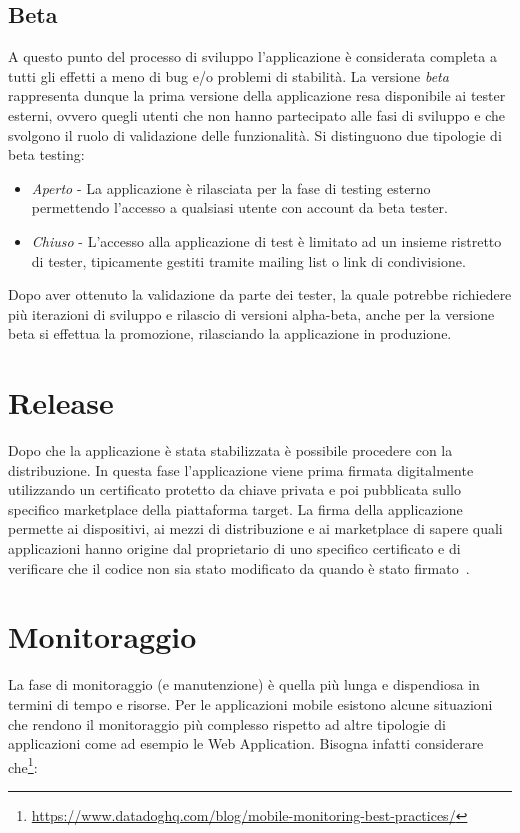 \subsection{Beta}
A questo punto del processo di sviluppo l'applicazione è considerata completa a tutti gli effetti a meno di bug e/o problemi di stabilità. La versione \textit{beta} rappresenta dunque la prima versione della applicazione resa disponibile ai tester esterni, ovvero quegli utenti che non hanno partecipato alle fasi di sviluppo e che svolgono il ruolo di validazione delle funzionalità. Si distinguono due tipologie di beta testing:

\begin{itemize}
    \item \textit{Aperto} - La applicazione è rilasciata per la fase di testing esterno permettendo l'accesso a qualsiasi utente con account da beta tester.
    \item \textit{Chiuso} - L'accesso alla applicazione di test è limitato ad un insieme ristretto di tester, tipicamente gestiti tramite mailing list o link di condivisione.
\end{itemize}

Dopo aver ottenuto la validazione da parte dei tester, la quale potrebbe richiedere più iterazioni di sviluppo e rilascio di versioni alpha-beta, anche per la versione beta si effettua la promozione, rilasciando la applicazione in produzione.

\section{Release}
Dopo che la applicazione è stata stabilizzata è possibile procedere con la distribuzione. In questa fase l'applicazione viene prima firmata digitalmente utilizzando un certificato protetto da chiave privata e poi pubblicata sullo specifico marketplace della piattaforma target. La firma della applicazione permette ai dispositivi, ai mezzi di distribuzione e ai marketplace di sapere quali applicazioni hanno origine dal proprietario di uno specifico certificato e di verificare che il codice non sia stato modificato da quando è stato firmato~\cite{mednieks2011programming}.

\section{Monitoraggio}
La fase di monitoraggio (e manutenzione) è quella più lunga e dispendiosa in termini di tempo e risorse. Per le applicazioni mobile esistono alcune situazioni che rendono il monitoraggio più complesso rispetto ad altre tipologie di applicazioni come ad esempio le Web Application. Bisogna infatti considerare che\footnote{\href{https://www.datadoghq.com/blog/mobile-monitoring-best-practices/}{https://www.datadoghq.com/blog/mobile-monitoring-best-practices/}}:


